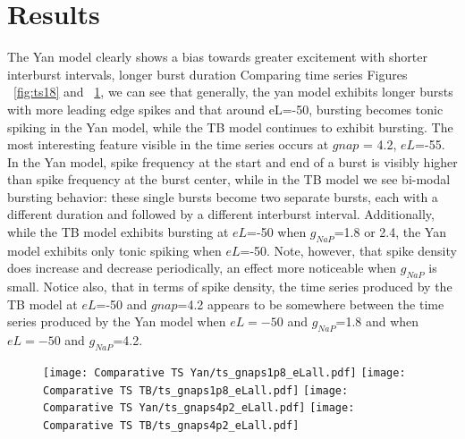 \documentclass[11pt]{article}
\begin{document}
\oddsidemargin -0.22in
\evensidemargin -0.22in
\topmargin 0.05in
\topskip 0.25in
\headheight 0.05in
\headsep 0.25in

\graphicspath{{"../Data and Analysis/long TB Yan/plots/"}{"../Data and Analysis/short TB Yan/plots/"}}

\FloatBarrier
\section{Results}
The Yan model clearly shows a bias towards greater excitement with shorter interburst intervals, longer burst duration
Comparing time series Figures ~\ref{fig:ts18} and ~\ref{fig:ts42}, we can see that generally, the yan model exhibits longer bursts with more leading edge spikes and that around eL=-50, bursting becomes tonic spiking in the Yan model, while the TB model continues to exhibit bursting. The most interesting feature visible in the time series occurs at $gnap$ = 4.2, $eL$=-55. In the Yan model, spike frequency at the start and end of a burst is visibly higher than spike frequency at the burst center, while in the TB model we see bi-modal bursting behavior: these single bursts become two separate bursts, each with a different duration and followed by a different interburst interval. Additionally, while the TB model exhibits bursting at $eL$=-50 when $g_{NaP}$=1.8 or 2.4, the Yan model exhibits only tonic spiking when  $eL$=-50. Note, however, that spike density does increase and decrease periodically, an effect more noticeable when $g_{NaP}$ is small. Notice also, that in terms of spike density, the time series produced by the TB model at $eL$=-50 and $gnap$=4.2 appears to be somewhere between the time series produced by the Yan model when $eL=-50$ and $g_{NaP}$=1.8 and when $eL=-50$ and $g_{NaP}$=4.2.

\begin{figure}[h]
	\centering
	\texttt{[image: Comparative TS Yan/ts\_gnaps1p8\_eLall.pdf]}
	\texttt{[image: Comparative TS TB/ts\_gnaps1p8\_eLall.pdf]}
	\texttt{[image: Comparative TS Yan/ts\_gnaps4p2\_eLall.pdf]}
	\texttt{[image: Comparative TS TB/ts\_gnaps4p2\_eLall.pdf]}
	\label{fig:ts42}
\end{figure}
\end{document}
